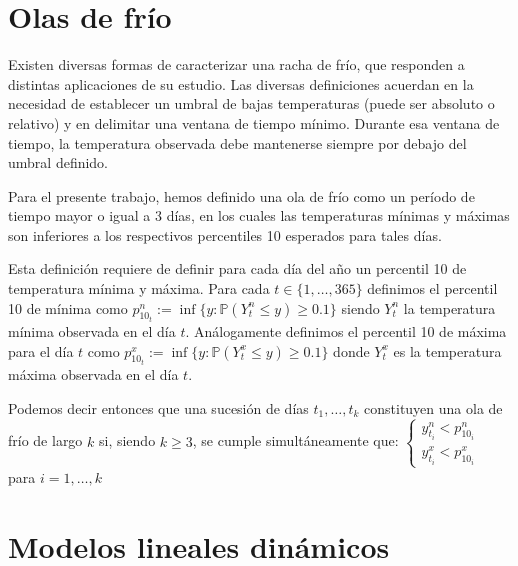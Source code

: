 \documentclass{article}
\newcommand{\p}{\mathbb{P}}
\begin{document}
\section{Olas de frío}

Existen diversas formas de caracterizar una racha de frío, que responden a distintas aplicaciones de su estudio. Las diversas definiciones acuerdan en la necesidad de establecer un umbral de bajas temperaturas (puede ser absoluto o relativo) y en delimitar una ventana de tiempo mínimo. Durante esa ventana de tiempo, la temperatura observada debe mantenerse siempre por debajo del umbral definido.

Para el presente trabajo, hemos definido una ola de frío como un período de tiempo mayor o igual a 3 días, en los cuales las temperaturas mínimas y máximas son inferiores a los respectivos percentiles 10 esperados para tales días.

Esta definición requiere de definir para cada día del año un percentil 10 de temperatura mínima y máxima. Para cada $t \in \{1,\dots, 365\}$ definimos el percentil 10 de mínima como $p^n_{10_t}:= \inf\{y: \p(Y^n_t \leq y)\geq 0.1\}$ siendo $Y^n_t$ la temperatura mínima observada en el día $t$. Análogamente definimos el percentil 10 de máxima para el día $t$ como $p^x_{10_t}:= \inf\{y: \p(Y^x_t \leq y)\geq 0.1\}$ donde $Y^x_t$ es la temperatura máxima observada en el día $t$.

Podemos decir entonces que una sucesión de días $t_1, \dots, t_k$ constituyen una ola de frío de largo $k$ si, siendo $k\geq 3$, se cumple simultáneamente que:
$\begin{cases} y^n_{t_i} < p^n_{10_i}  \\ y^x_{t_i} < p^x_{10_i} \end{cases}$ para $i=1,\dots,k$

\section{Modelos lineales dinámicos}

%
\end{document}
